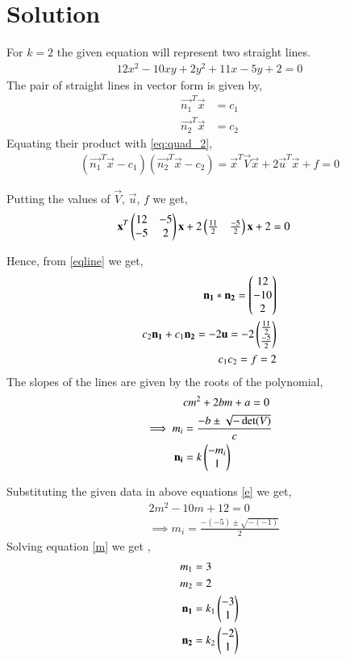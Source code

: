 \documentclass[journal,12pt,twocolumn]{IEEEtran}
\begin{document}
\section{Solution}
For $k = 2$ the given equation will represent two straight lines.
\begin{align}
12x^2-10xy+2y^2+11x-5y+2 = 0 \label{eq:op1}
\end{align}
The pair of straight lines in vector form is given by, 
\begin{align}
    \vec{n_1}^T\vec{x}&=c_1\label{m1}\\
    \vec{n_2}^T\vec{x}&=c_2\label{m2}
\end{align}
Equating their product with \eqref{eq:quad_2}, 
\begin{align}
    (\vec{n_1}^T\vec{x}-c_1)(\vec{n_2}^T\vec{x}-c_2)
    = \vec{x}^T\vec{V}\vec{x}+2\vec{u}^T\vec{x}+f=0
\end{align}

Putting the values of $\vec{V}$, $\vec{u}$, $f$ we get,
\begin{align}
\mathbf{x}^T\begin{pmatrix}12 & -5\\ -5 & 2\end{pmatrix}\mathbf{x}+2\begin{pmatrix}\frac{11}{2} & \frac{-5}{2}\end{pmatrix}\mathbf{x} + 2 &=0\label{eqline}
\end{align}

Hence, from \eqref{eqline} we get,
\begin{align}
\mathbf{n_1}*\mathbf{n_2}=  \begin{pmatrix}12 \\ -10 \\ 2\end{pmatrix}\label{conv}\\
c_2\mathbf{n_1}+c_1\mathbf{n_2} = -2\mathbf{u} =  -2\begin{pmatrix}\frac{11}{2}\\ \frac{-5}{2}\end{pmatrix} \label{eqc1c2}\\
c_1c_2 = f = 2
\end{align}
The slopes of the lines are given by the roots of the polynomial,
\begin{align}
    &cm^2+2bm+a=0\label{e}\\
    \implies m_i&=\frac{-b\pm{\sqrt{-\det(V)}}}{c}\\
    \mathbf{n_i}&=k\begin{pmatrix}-m_i\\1\end{pmatrix}
\end{align}

Substituting the given data in above equations \eqref{e} we get,
\begin{align}
    &2m^2 -10m + 12 = 0\\
    &\implies m_i = \frac{-(-5)\pm{\sqrt{-(-1)}}}{2}\label{m}
\end{align}
Solving equation \eqref{m} we get ,
\begin{align}
    m_1&= 3 \\
    m_2&= 2 \\
    \mathbf{n_1}&=k_1\begin{pmatrix}-3 \\ 1\end{pmatrix}\label{n1}\\
    \mathbf{n_2}&=k_2\begin{pmatrix}-2 \\ 1\end{pmatrix}\label{n2}
\end{align}
\end{document}
